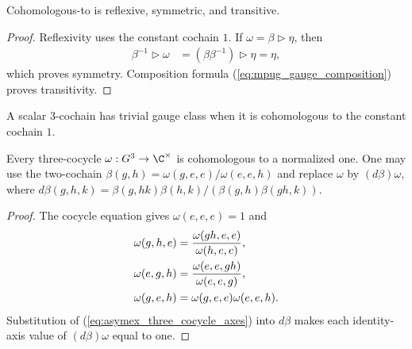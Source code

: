 \begin{lemma}
    \label{thm:mpug_cohomologous_to_equivalence}
    \leanok
    Cohomologous-to is reflexive, symmetric, and transitive.
\end{lemma}
\begin{proof}\leanok
    Reflexivity uses the constant cochain $1$. If $\omega=
        \beta\mathbin{\triangleright}\eta$, then
    \begin{align}
        \beta^{-1}\mathbin{\triangleright}\omega
         & =(\beta\beta^{-1})\mathbin{\triangleright}\eta
        =\eta,
    \end{align}
    which proves symmetry. Composition formula
    (\ref{eq:mpug_gauge_composition}) proves transitivity.
\end{proof}

\begin{definition}
    \label{def:mpug_trivial_gauge_class}
    \leanok
    A scalar $3$-cochain has trivial gauge class when it is cohomologous to
    the constant cochain $1$.
\end{definition}

\begin{lemma}
    \label{thm:asymex_three_cocycle_normalization}
    \leanok
    Every three-cocycle $\omega:G^3\to\C^\times$ is cohomologous to a
    normalized one. One may use the two-cochain
    $\beta(g,h)=\omega(g,e,e)/\omega(e,e,h)$ and replace $\omega$ by
    $(d\beta)\omega$, where
    $d\beta(g,h,k)=\beta(g,hk)\beta(h,k)/(\beta(g,h)\beta(gh,k))$.
\end{lemma}
\begin{proof}
    \leanok
    The cocycle equation gives $\omega(e,e,e)=1$ and
    \begin{align}
        \label{eq:asymex_three_cocycle_axes}
        \omega(g,h,e) & =\frac{\omega(gh,e,e)}{\omega(h,e,e)},       \\
        \omega(e,g,h) & =\frac{\omega(e,e,gh)}{\omega(e,e,g)},\notag \\
        \omega(g,e,h) & =\omega(g,e,e)\omega(e,e,h).\notag
    \end{align}
    Substitution of (\ref{eq:asymex_three_cocycle_axes}) into $d\beta$
    makes each identity-axis value of $(d\beta)\omega$ equal to one.
\end{proof}

